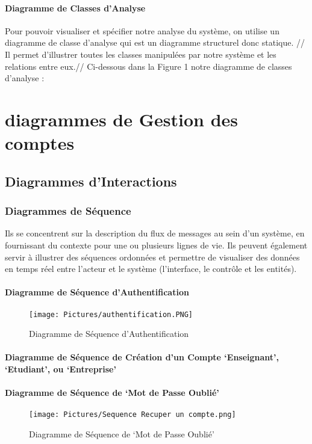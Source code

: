 \documentclass[11pt,fleqn]{book} %
\begin{document}
\subsubsection{Diagramme de Classes d’Analyse}
Pour pouvoir visualiser et spécifier notre analyse du système, on utilise un diagramme de classe d’analyse qui est un diagramme structurel donc statique. //
Il permet d’illustrer toutes les classes manipulées par notre système et les relations 
entre eux.//
Ci-dessous dans la Figure 1 notre diagramme de classes d’analyse :
\chapter{diagrammes de Gestion des comptes}
\section{Diagrammes d'Interactions}
\subsection{Diagrammes de Séquence}
Ils se concentrent sur la description du flux de messages au sein d'un système, en fournissant du contexte pour une ou plusieurs lignes de vie. Ils peuvent également servir à illustrer des séquences ordonnées et permettre de visualiser des données en temps réel entre l’acteur et le système (l’interface, le contrôle et les entités).
\newpage
\subsubsection{Diagramme de Séquence d’Authentification}
\begin{figure}[h]
    \centering
    \texttt{[image: Pictures/authentification.PNG]}
    \caption{Diagramme de Séquence d’Authentification}
    \label{fig:pca}
\end{figure}
\newpage
\subsubsection{Diagramme de Séquence de Création d’un 
Compte ‘Enseignant’, ‘Etudiant’, ou ‘Entreprise’}


\newpage
\subsubsection{ Diagramme de Séquence de ‘Mot de Passe Oublié’}
\begin{figure}[h]
    \centering
    \texttt{[image: Pictures/Sequence Recuper un compte.png]}
    \caption{Diagramme de Séquence de ‘Mot de Passe Oublié’}
    \label{fig:pca}
\end{figure}
\newpage
\end{document}
